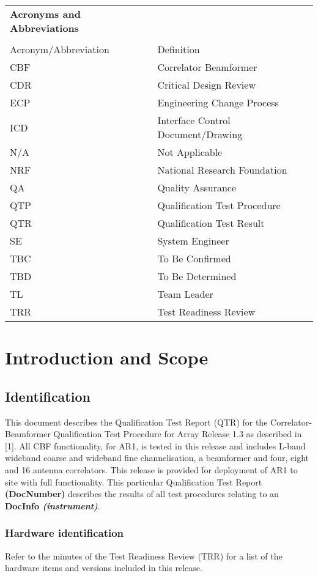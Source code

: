 \begin{longtable}{ll}
	{\bf\LARGE Acronyms and Abbreviations} & \\\\
	Acronym/Abbreviation & Definition \\
	CBF & Correlator Beamformer \\
	CDR & Critical Design Review \\
	ECP & Engineering Change Process \\
	ICD & Interface Control Document/Drawing \\
	N/A & Not Applicable \\
	NRF & National Research Foundation \\
	QA  & Quality Assurance \\
	QTP & Qualification Test Procedure \\
	QTR & Qualification Test Result \\
	SE  & System Engineer \\
	TBC & To Be Confirmed \\
	TBD & To Be Determined \\
	TL  & Team Leader \\
	TRR & Test Readiness Review \\
\end{longtable}

\chapter{Introduction and Scope}
\section{Identification}
This document describes the Qualification Test Report (QTR) for the Correlator-Beamformer Qualification Test Procedure for Array Release 1.3 as described in [1].\newline
All CBF functionality, for AR1, is tested in this release and includes L-band wideband coarse and wideband fine channelisation, a beamformer and four, eight and 16 antenna correlators.\newline
This release is provided for deployment of AR1 to site with full functionality.
This particular Qualification Test Report {\bf (DocNumber)} describes the results of all test procedures relating to an {\bf DocInfo \it{(instrument)}}.
\subsection{Hardware identification}
Refer to the minutes of the Test Readiness Review (TRR) for a list of the hardware items and versions included in this release.
